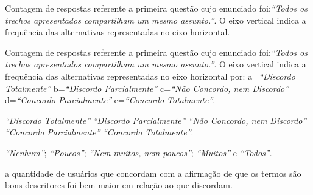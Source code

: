 	\caption{Contagem de respostas referente a primeira questão cujo enunciado foi:\textit{``Todos os trechos apresentados compartilham um mesmo assunto.''}. O eixo vertical indica a frequência das alternativas representadas no eixo horizontal. }






	\caption{Contagem de respostas referente a primeira questão cujo enunciado foi:\textit{``Todos os trechos apresentados compartilham um mesmo assunto.''}. O eixo vertical indica a frequência das alternativas representadas no eixo horizontal por:
		a=\textit{``Discordo Totalmente''}
		b=\textit{``Discordo Parcialmente''}
		c=\textit{``Não Concordo, nem Discordo''}
		d=\textit{``Concordo Parcialmente''}
		e=\textit{``Concordo Totalmente''}.
	}



		\textit{``Discordo Totalmente''}
		\textit{``Discordo Parcialmente''}
		\textit{``Não Concordo, nem Discordo''}
		\textit{``Concordo Parcialmente''}
		\textit{``Concordo Totalmente''}.


		\textit{``Nenhum''};
		\textit{``Poucos''};
		\textit{``Nem muitos, nem poucos''};
		\textit{``Muitos''} e 
		\textit{``Todos''}.



% 
%



a quantidade de usuários que concordam com a afirmação de que os termos são bons descritores foi bem maior em relação ao que discordam.


